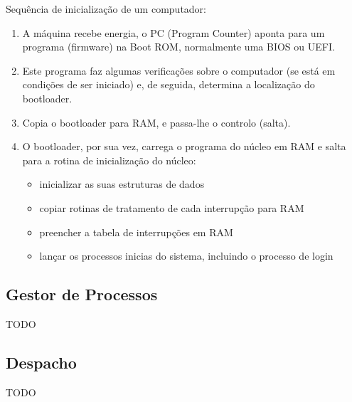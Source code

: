 \documentclass[11pt]{article}
\begin{document}
Sequência de inicialização de um computador:
\begin{enumerate}[topsep=0pt,itemsep=0pt]
    \item A máquina recebe energia, o PC (Program Counter) aponta para um programa (firmware) na Boot ROM, normalmente uma BIOS ou UEFI.
    \item  Este programa faz algumas verificações sobre o computador (se está em condições de ser iniciado) e, de seguida, determina a localização do bootloader.
    \item  Copia o bootloader para RAM, e passa-lhe o controlo (salta).
    \item O bootloader, por sua vez, carrega o programa do núcleo em RAM e salta para a rotina de inicialização do núcleo:
          \begin{itemize}[topsep=0pt]
              \item inicializar as suas estruturas de dados
              \item copiar rotinas de tratamento de cada interrupção para RAM
              \item preencher a tabela de interrupções em RAM
              \item lançar os processos inicias do sistema, incluindo o processo de login
          \end{itemize}
\end{enumerate}

\subsection{Gestor de Processos}

TODO

\subsection{Despacho}

TODO
\end{document}
